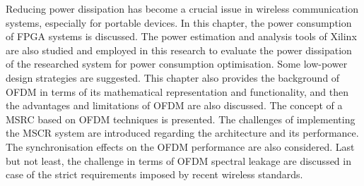 Reducing power dissipation has become a crucial issue in wireless communication systems, especially for portable devices. 
In this chapter, the power consumption of FPGA systems is discussed.
The power estimation and analysis tools of Xilinx are also studied and employed in this research to evaluate the power dissipation of the researched system for power consumption optimisation. 
Some low-power design strategies are suggested.
This chapter also provides the background of OFDM in terms of its mathematical representation and functionality, and then the advantages and limitations of OFDM are also discussed.
The concept of a MSRC based on OFDM techniques is presented. The challenges of implementing the MSCR system are introduced regarding the architecture and its performance.
The synchronisation effects on the OFDM performance are also considered. 
Last but not least, the challenge in terms of OFDM spectral leakage are discussed in case of the strict requirements imposed by recent wireless standards. 
